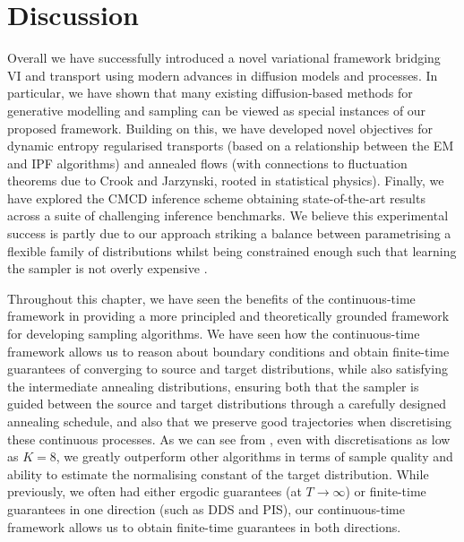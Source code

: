 
\section{Discussion}

Overall we have successfully introduced a novel variational framework bridging VI and transport using modern advances in diffusion models and processes. In particular, we have shown that many existing diffusion-based methods for generative modelling and sampling can be viewed as special instances of our proposed framework. Building on this, we have developed novel objectives for dynamic entropy regularised transports (based on a relationship between the EM and IPF algorithms) and annealed flows (with connections to fluctuation theorems due to Crook and Jarzynski, rooted in statistical physics). Finally, we have explored the CMCD inference scheme obtaining state-of-the-art results across a suite of challenging inference benchmarks. We believe this experimental success is partly due to our approach striking a balance between parametrising a flexible family of distributions whilst being constrained enough such that learning the sampler is not overly expensive \parencite{tzen2019theoretical,vargas2023expressiveness}.

Throughout this chapter, we have seen the benefits of the continuous-time framework in providing a more principled and theoretically grounded framework for developing sampling algorithms. We have seen how the continuous-time framework allows us to reason about boundary conditions and obtain finite-time guarantees of converging to source and target distributions, while also satisfying the intermediate annealing distributions, ensuring both that the sampler is guided between the source and target distributions through a carefully designed annealing schedule, and also that we preserve good trajectories when discretising these continuous processes. As we can see from , even with discretisations as low as $K = 8$, we greatly outperform other algorithms in terms of sample quality and ability to estimate the normalising constant of the target distribution. While previously, we often had either ergodic guarantees (at $T \to \infty$) or finite-time guarantees in one direction (such as DDS and PIS), our continuous-time framework allows us to obtain finite-time guarantees in both directions. 

